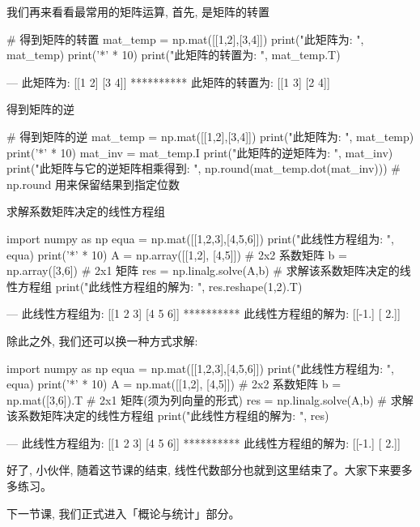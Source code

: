 我们再来看看最常用的矩阵运算, 首先, 是矩阵的转置

\begin{python}
# 得到矩阵的转置
mat_temp = np.mat([[1,2],[3,4]])
print("此矩阵为: \n", mat_temp)
print('*' * 10)
print("此矩阵的转置为: \n", mat_temp.T)

---
此矩阵为: 
 [[1 2]
 [3 4]]
**********
此矩阵的转置为: 
 [[1 3]
 [2 4]]
\end{python}

得到矩阵的逆

\begin{python}
# 得到矩阵的逆
mat_temp = np.mat([[1,2],[3,4]])
print("此矩阵为: \n", mat_temp)
print('*' * 10)
mat_inv = mat_temp.I
print("此矩阵的逆矩阵为: \n", mat_inv)
print("此矩阵与它的逆矩阵相乘得到: \n", np.round(mat_temp.dot(mat_inv)))    # np.round 用来保留结果到指定位数
\end{python}

求解系数矩阵决定的线性方程组

\begin{python}
import numpy as np
equa = np.mat([[1,2,3],[4,5,6]])
print("此线性方程组为: \n", equa)
print('*' * 10)
A = np.array([[1,2], [4,5]])   # 2x2 系数矩阵
b = np.array([3,6])            # 2x1 矩阵
res = np.linalg.solve(A,b)     # 求解该系数矩阵决定的线性方程组
print("此线性方程组的解为: \n", res.reshape(1,2).T)

---
此线性方程组为: 
 [[1 2 3]
 [4 5 6]]
**********
此线性方程组的解为: 
 [[-1.]
 [ 2.]]
\end{python}

除此之外, 我们还可以换一种方式求解: 


\begin{python}
import numpy as np
equa = np.mat([[1,2,3],[4,5,6]])
print("此线性方程组为: \n", equa)
print('*' * 10)
A = np.mat([[1,2], [4,5]])   # 2x2 系数矩阵
b = np.mat([3,6]).T  # 2x1 矩阵(须为列向量的形式)
res = np.linalg.solve(A,b)   # 求解该系数矩阵决定的线性方程组
print("此线性方程组的解为: \n", res)

---
此线性方程组为: 
 [[1 2 3]
 [4 5 6]]
**********
此线性方程组的解为: 
 [[-1.]
 [ 2.]]
\end{python}

好了, 小伙伴, 随着这节课的结束, 线性代数部分也就到这里结束了。大家下来要多多练习。

下一节课, 我们正式进入「概论与统计」部分。